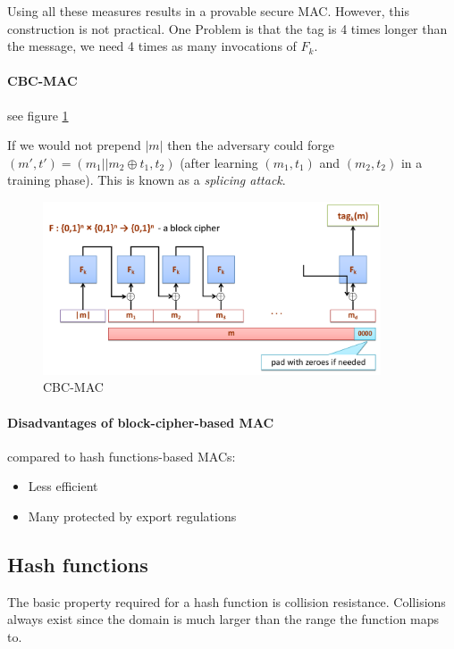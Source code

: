 Using all these measures results in a provable secure MAC. However, this construction is not practical. One Problem is that the tag is 4 times longer than the message, we need 4 times as many invocations of $F_k$.

\paragraph{CBC-MAC} see figure \ref{fig:cbc-mac}

If we would not prepend $|m|$ then the adversary could forge $ (m', t') = (m_1 || m_2 \oplus t_1, t_2) $ (after learning $(m_1, t_1)$ and $(m_2, t_2)$ in a training phase). This is known as a \textit{splicing attack}.

\begin{figure}[h]
    \centering
    \includegraphics[width=10cm]{images/ch4-cbc-mac.png}
    \caption{CBC-MAC}
    \label{fig:cbc-mac}
\end{figure}

\paragraph{Disadvantages of block-cipher-based MAC} compared to hash functions-based MACs:

\begin{itemize}
    \item Less efficient
    \item Many protected by export regulations
\end{itemize}



\subsection{Hash functions} \label{section-hash-fucntions}

The basic property required for a hash function is collision resistance. Collisions always exist since the domain is much larger than the range the function maps to.

